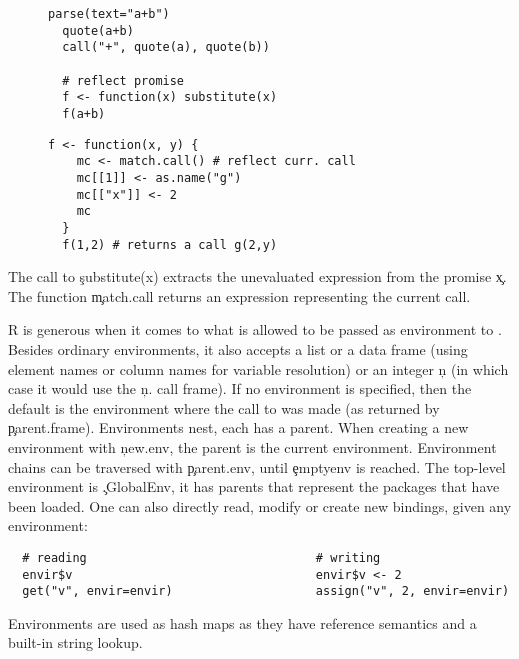 \documentclass[screen,acmsmall]{acmart}
\begin{document}
\vspace*{-2mm}
\begin{figure}[htb]
\begin{minipage}{.49\textwidth}
\begin{lstlisting}[caption={Examples of calls producing expression \c{a+b}}]
  parse(text="a+b")
  quote(a+b)
  call("+", quote(a), quote(b))

  # reflect promise
  f <- function(x) substitute(x)
  f(a+b)
  \end{lstlisting}
\end{minipage}
\begin{minipage}{.49\textwidth}
  \begin{lstlisting}[caption={Example of a call reflection}]
  f <- function(x, y) {
    mc <- match.call() # reflect curr. call
    mc[[1]] <- as.name("g")
    mc[["x"]] <- 2
    mc
  }
  f(1,2) # returns a call g(2,y)
  \end{lstlisting}
\end{minipage}
\end{figure}

\vspace*{-2mm}
\noindent The call to \c{substitute(x)} extracts the unevaluated expression from the
promise \c{x}. The function \c{match.call} returns an expression representing the current call.

R is generous when it comes to what is allowed to be passed as environment to
\eval. Besides ordinary environments, it also accepts a list or a data
frame (using element names or column names for variable resolution) or an
integer \c{n} (in which case it would use the \c{n.} call frame). If no
environment is specified, then the default is the environment where the call to
\eval was made (as returned by \c{parent.frame}).
%
Environments nest, each has a parent. When creating a new environment with
\c{new.env}, the parent is the current environment. Environment chains can be
traversed with \c{parent.env}, until \c{emptyenv} is reached. The top-level
environment is \c{.GlobalEnv}, it has parents that represent the packages that
have been loaded. One can also directly read, modify or create new bindings,
given any environment:
%
\begin{lstlisting}
  # reading                                # writing
  envir$v                                  envir$v <- 2
  get("v", envir=envir)                    assign("v", 2, envir=envir)
\end{lstlisting}
%
\noindent Environments are used as hash maps as they have reference semantics
and a built-in string lookup.
\end{document}
